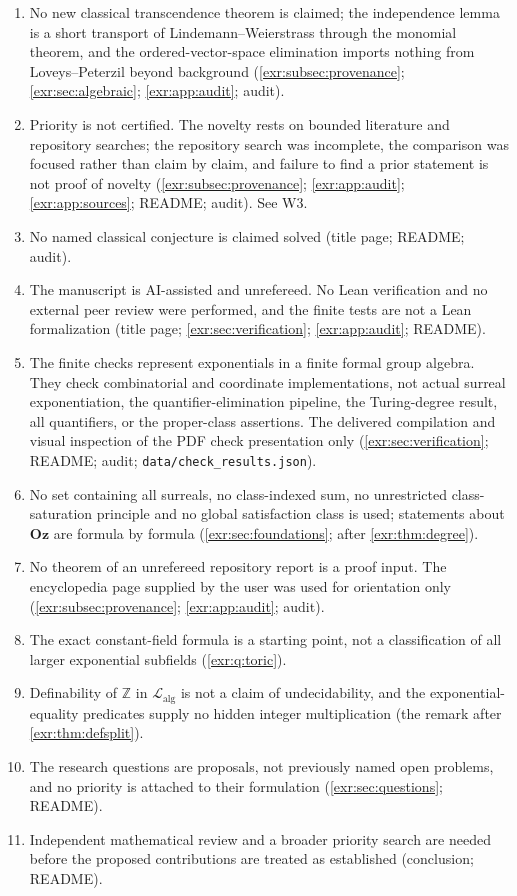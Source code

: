 \documentclass[11pt,letterpaper]{article}
\numberwithin{equation}{section}
\theoremstyle{definition}
\theoremstyle{remark}
\newcommand{\Oz}{\mathbf{Oz}}
\newcommand{\Z}{\mathbb Z}
\newcommand{\Lalg}{\mathcal L_{\mathrm{alg}}}
\newcommand{\rpath}[1]{\nolinkurl{#1}}%
\begin{document}
\begin{enumerate}[label=S\arabic*.,leftmargin=2.6em,itemsep=2pt]
(\cref{exr:sec:foundations}; \cref{exr:app:audit}; README; audit).
\item No new classical transcendence theorem is claimed; the independence
lemma is a short transport of Lindemann--Weierstrass through the monomial
theorem, and the ordered-vector-space elimination imports nothing from
Loveys--Peterzil beyond background (\cref{exr:subsec:provenance};
\cref{exr:sec:algebraic}; \cref{exr:app:audit}; audit).
\item Priority is not certified. The novelty rests on bounded literature and
repository searches; the repository search was incomplete, the comparison
was focused rather than claim by claim, and failure to find a prior statement
is not proof of novelty (\cref{exr:subsec:provenance}; \cref{exr:app:audit};
\cref{exr:app:sources}; README; audit). See W3.
\item No named classical conjecture is claimed solved (title page; README;
audit).
\item The manuscript is AI-assisted and unrefereed. No Lean verification
and no external peer review were performed, and the finite tests are not a
Lean formalization (title page; \cref{exr:sec:verification};
\cref{exr:app:audit}; README).
\item The finite checks represent exponentials in a finite formal group
algebra. They check combinatorial and coordinate implementations, not actual
surreal exponentiation, the quantifier-elimination pipeline, the Turing-degree
result, all quantifiers, or the proper-class assertions. The delivered
compilation and visual inspection of the PDF check presentation only
(\cref{exr:sec:verification}; README; audit; \rpath{data/check_results.json}).
\item No set containing all surreals, no class-indexed sum, no unrestricted
class-saturation principle and no global satisfaction class is used;
statements about $\Oz$ are formula by formula
(\cref{exr:sec:foundations}; after \cref{exr:thm:degree}).
\item No theorem of an unrefereed repository report is a proof input. The
encyclopedia page supplied by the user was used for orientation only
(\cref{exr:subsec:provenance}; \cref{exr:app:audit}; audit).
\item The exact constant-field formula is a starting point, not a
classification of all larger exponential subfields (\cref{exr:q:toric}).
\item Definability of $\Z$ in $\Lalg$ is not a claim of undecidability, and
the exponential-equality predicates supply no hidden integer multiplication
(the remark after \cref{exr:thm:defsplit}).
\item The research questions are proposals, not previously named open
problems, and no priority is attached to their formulation
(\cref{exr:sec:questions}; README).
\item Independent mathematical review and a broader priority search are
needed before the proposed contributions are treated as established
(conclusion; README).
\end{enumerate}
\end{document}
